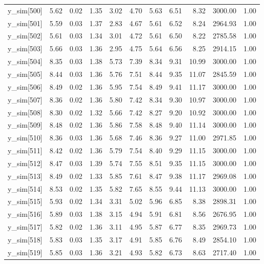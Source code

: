 \begin{table}[ht]
\begin{tabular}{rrrrrrrrrrr}
  y\_sim[500] & 5.62 & 0.02 & 1.35 & 3.02 & 4.70 & 5.63 & 6.51 & 8.32 & 3000.00 & 1.00 \\ 
  y\_sim[501] & 5.59 & 0.03 & 1.37 & 2.83 & 4.67 & 5.61 & 6.52 & 8.24 & 2964.93 & 1.00 \\ 
  y\_sim[502] & 5.61 & 0.03 & 1.34 & 3.01 & 4.72 & 5.61 & 6.50 & 8.22 & 2785.58 & 1.00 \\ 
  y\_sim[503] & 5.66 & 0.03 & 1.36 & 2.95 & 4.75 & 5.64 & 6.56 & 8.25 & 2914.15 & 1.00 \\ 
  y\_sim[504] & 8.35 & 0.03 & 1.38 & 5.73 & 7.39 & 8.34 & 9.31 & 10.99 & 3000.00 & 1.00 \\ 
  y\_sim[505] & 8.44 & 0.03 & 1.36 & 5.76 & 7.51 & 8.44 & 9.35 & 11.07 & 2845.59 & 1.00 \\ 
  y\_sim[506] & 8.49 & 0.02 & 1.36 & 5.95 & 7.54 & 8.49 & 9.41 & 11.17 & 3000.00 & 1.00 \\ 
  y\_sim[507] & 8.36 & 0.02 & 1.36 & 5.80 & 7.42 & 8.34 & 9.30 & 10.97 & 3000.00 & 1.00 \\ 
  y\_sim[508] & 8.30 & 0.02 & 1.32 & 5.66 & 7.42 & 8.27 & 9.20 & 10.92 & 3000.00 & 1.00 \\ 
  y\_sim[509] & 8.48 & 0.02 & 1.36 & 5.86 & 7.58 & 8.48 & 9.40 & 11.14 & 3000.00 & 1.00 \\ 
  y\_sim[510] & 8.36 & 0.03 & 1.36 & 5.68 & 7.46 & 8.36 & 9.27 & 11.00 & 2971.85 & 1.00 \\ 
  y\_sim[511] & 8.42 & 0.02 & 1.36 & 5.79 & 7.54 & 8.40 & 9.29 & 11.15 & 3000.00 & 1.00 \\ 
  y\_sim[512] & 8.47 & 0.03 & 1.39 & 5.74 & 7.55 & 8.51 & 9.35 & 11.15 & 3000.00 & 1.00 \\ 
  y\_sim[513] & 8.49 & 0.02 & 1.33 & 5.85 & 7.61 & 8.47 & 9.38 & 11.17 & 2969.08 & 1.00 \\ 
  y\_sim[514] & 8.53 & 0.02 & 1.35 & 5.82 & 7.65 & 8.55 & 9.44 & 11.13 & 3000.00 & 1.00 \\ 
  y\_sim[515] & 5.93 & 0.02 & 1.34 & 3.31 & 5.02 & 5.96 & 6.85 & 8.38 & 2898.31 & 1.00 \\ 
  y\_sim[516] & 5.89 & 0.03 & 1.38 & 3.15 & 4.94 & 5.91 & 6.81 & 8.56 & 2676.95 & 1.00 \\ 
  y\_sim[517] & 5.82 & 0.02 & 1.36 & 3.11 & 4.95 & 5.87 & 6.77 & 8.35 & 2969.73 & 1.00 \\ 
  y\_sim[518] & 5.83 & 0.03 & 1.35 & 3.17 & 4.91 & 5.85 & 6.76 & 8.49 & 2854.10 & 1.00 \\ 
  y\_sim[519] & 5.85 & 0.03 & 1.36 & 3.21 & 4.93 & 5.82 & 6.73 & 8.63 & 2717.40 & 1.00 \\ 

\end{tabular}
\end{table}

